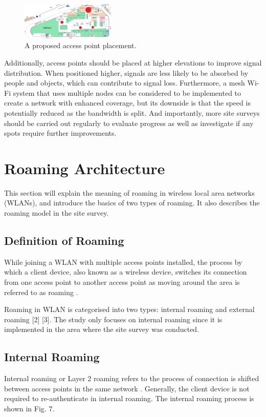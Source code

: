 \documentclass[conference]{IEEEtran}
\begin{document}
\begin{figure}[htbp]
    \centering
    \includegraphics[width=0.4\textwidth]{acesspoint.png}
    \caption{A proposed access point placement.}
\end{figure}

Additionally, access points should be placed at higher elevations to improve signal distribution. When positioned higher, signals are less likely to be absorbed by people and objects, which can contribute to signal loss. Furthermore, a mesh Wi-Fi system that uses multiple nodes can be considered to be implemented to create a network with enhanced coverage, but its downside is that the speed is potentially reduced as the bandwidth is split. And importantly, more site surveys should be carried out regularly to evaluate progress as well as investigate if any spots require further improvements.

\section{Roaming Architecture}

This section will explain the meaning of roaming in wireless local area networks (WLANs), and introduce the basics of two types of roaming. It also describes the roaming model in the site survey.

\subsection{Definition of Roaming}
While joining a WLAN with multiple access points installed, the process by which a client device, also known as a wireless device, switches its connection from one access point to another access point as moving around the area is referred to as roaming \cite{article_example}.

Roaming in WLAN is categorised into two types: internal roaming and external roaming [2] [3]. The study only focuses on internal roaming since it is implemented in the area where the site survey was conducted.

\subsection{Internal Roaming}
Internal roaming or Layer 2 roaming refers to the process of connection is shifted between access points in the same network \cite{article_example}. Generally, the client device is not required to re-authenticate in internal roaming. The internal roaming process is shown in Fig. 7.
\end{document}
